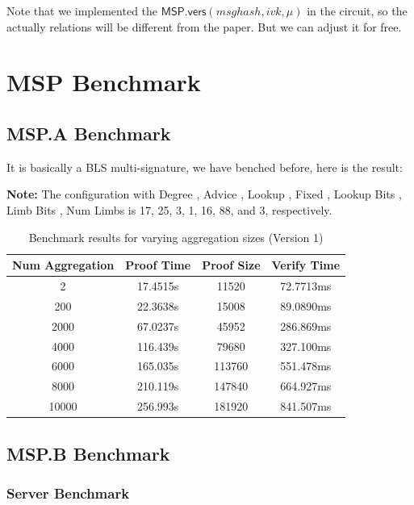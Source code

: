 \documentclass{article}
\begin{document}
Note that we implemented the $\mathsf{MSP.vers}(msghash,ivk, \mu)$ in the circuit, so the actually relations will be different from the paper. But we can adjust it for free.



\section{MSP Benchmark}


\subsection{MSP.A Benchmark}

It is basically a BLS multi-signature, we have benched before, here is the result:


\textbf{Note:} The configuration with Degree , Advice , Lookup , Fixed , Lookup Bits , Limb Bits , Num Limbs is 17, 25, 3, 1, 16, 88, and 3, respectively.

\begin{table}[h]
    \centering
    \begin{tabular}{c|c|c|c} \hline
        Num Aggregation & Proof Time & Proof Size & Verify Time \\ \hline
        2 & 17.4515s & 11520 & 72.7713ms \\ \hline
        200 & 22.3638s & 15008 & 89.0890ms \\ \hline
        2000 & 67.0237s & 45952 & 286.869ms \\ \hline
        4000 & 116.439s & 79680 & 327.100ms \\ \hline
        6000 & 165.035s & 113760 & 551.478ms \\ \hline
        8000 & 210.119s & 147840 & 664.927ms \\ \hline
        10000 & 256.993s & 181920 & 841.507ms \\ \hline
    \end{tabular}
    \caption{Benchmark results for varying aggregation sizes (Version 1)}
    \label{tab:version1_agg}
\end{table}


\subsection{MSP.B Benchmark}

\subsubsection{Server Benchmark}
\end{document}
